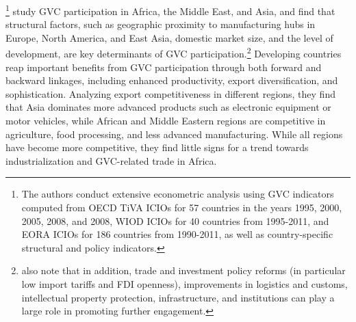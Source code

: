 \documentclass[a4paper]{article}
\begin{document}
\citet{kowalski2015participation}\footnote{The authors conduct extensive econometric analysis using GVC indicators computed from OECD TiVA ICIOs for 57 countries in the years 1995, 2000, 2005, 2008, and 2008, WIOD ICIOs for 40 countries from 1995-2011, and EORA ICIOs for 186 countries from 1990-2011, as well as country-specific structural and policy indicators.} study GVC participation in Africa, the Middle East, and Asia, and find that structural factors, such as geographic proximity to manufacturing hubs in Europe, North America, and East Asia, domestic market size, and the level of development, are key determinants of GVC participation.\footnote{\citet{kowalski2015participation} also note that in addition, trade and investment policy reforms (in particular low import tariffs and FDI openness), improvements in logistics and customs, intellectual property protection, infrastructure, and institutions can play a large role in promoting further engagement.}  Developing countries reap important benefits from GVC participation through both forward and backward linkages, including enhanced productivity, export diversification, and sophistication. Analyzing export competitiveness in different regions, they find that Asia dominates more advanced products such as electronic equipment or motor vehicles, while African and Middle Eastern regions are competitive in agriculture, food processing, and less advanced manufacturing. While all regions have become more competitive, they find little signs for a trend towards industrialization and GVC-related trade in Africa. \newline %
\end{document}
